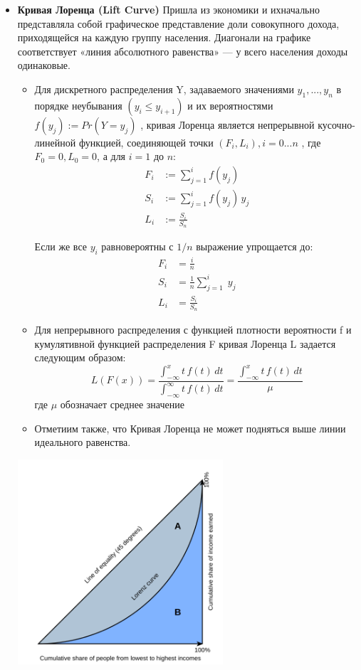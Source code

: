 \documentclass{article}
\begin{document}
\begin{itemize}
    \item {\bf Кривая Лоренца (Lift Curve)} Пришла из экономики и ихначально представляла собой графическое представление доли совокупного дохода, приходящейся на каждую группу населения. Диагонали на графике соответствует «линия абсолютного равенства» — у всего населения доходы одинаковые.

    \begin{itemize}
        \item Для дискретного распределения Y, задаваемого значениями $y_1, ..., y_n$ в порядке неубывания $(y_i ≤ y_{i+1})$ и их вероятностями $f(y_j) := Pr ( Y = y_j )$ , кривая Лоренца является непрерывной кусочно-линейной функцией, соединяющей точки $( F_i , L_i ), i = 0...n$ , где $F_0 = 0, L_0 = 0$, а для $i = 1$ до $n$:
        $${\displaystyle {\begin{aligned}F_{i}&:=\sum _{j=1}^{i}f(y_{j})\\S_{i}&:=\sum _{j=1}^{i}f(y_{j})\,y_{j}\\L_{i}&:={\frac {S_{i}}{S_{n}}}\end{aligned}}}$$

        Если же все $y_i$ равновероятны с $1/n$ выражение упрощается до:
        $${\displaystyle {\begin{aligned}F_{i}&={\frac {i}{n}}\\S_{i}&={\frac {1}{n}}\sum _{j=1}^{i}\;y_{j}\\L_{i}&={\frac {S_{i}}{S_{n}}}\end{aligned}}}$$

        \item Для непрерывного распределения с функцией плотности вероятности f и кумулятивной функцией распределения F кривая Лоренца L задается следующим образом:
        $${\displaystyle L(F(x))={\frac {\int _{-\infty }^{x}t\,f(t)\,dt}{\int _{-\infty }^{\infty }t\,f(t)\,dt}}={\frac {\int _{-\infty }^{x}t\,f(t)\,dt}{\mu }}}$$
        где $\mu$ обозначает среднее значение

        \item Отметиим также, что Кривая Лоренца не может подняться выше линии идеального равенства.
    \end{itemize}



    \begin{center}
      \includegraphics[width=0.6\textwidth]{pics/lfu2.png}
    \end{center} 


\end{itemize}
\end{document}

